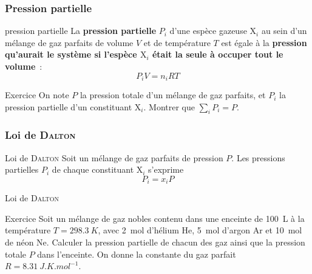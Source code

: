 \documentclass[../main/main.tex]{subfiles}
\begin{document}
\subsubsection{Pression partielle}
\begin{tcbraster}[raster columns=2, raster equal height=rows]
    \begin{defi}[label=def:ppartielle]{pression partielle}
        La \textbf{pression partielle} $P_i$ d'une espèce gazeuse $\mathrm{X}_i$ au sein d'un
        mélange de gaz parfaits de volume $V$ et de température $T$ est égale à
        la \textbf{pression qu'aurait le système si l'espèce $\mathrm{X}_i$ était la
        seule à occuper tout le volume}~:
        \[\boxed{P_iV = n_i RT}\]
    \end{defi}
    \begin{NCexem}[width=\linewidth]{Exercice}
        On note $P$ la pression totale d'un mélange de gaz parfaits, et $P_i$ la
        pression partielle d'un constituant $\mathrm{X}_i$. Montrer que $\sum_i P_i = P$.
        \tcblower
    \end{NCexem}
\end{tcbraster}

\subsubsection{Loi de \textsc{Dalton}}
\begin{tcbraster}[raster columns=2, raster equal height=rows]
    \begin{loi}[label=loi:dalton]{Loi de \textsc{Dalton}}
        Soit un mélange de gaz parfaits de pression $P$. Les pressions
        partielles $P_i$ de chaque constituant $\mathrm{X}_i$ s'exprime
        \[\boxed{P_i = x_iP}\]
    \end{loi}
    \begin{demo}[label=demo:dalton]{Loi de \textsc{Dalton}}
        
    \end{demo}
\end{tcbraster}

\begin{NCexem}[width=\linewidth]{Exercice}
    Soit un mélange de gaz nobles contenu dans une enceinte de \SI{100}{L} à la
    température $T = \SI{298.3}{K}$, avec \SI{2}{mol} d'hélium He, \SI{5}{mol}
    d'argon Ar et \SI{10}{mol} de néon Ne. Calculer la pression partielle de chacun
    des gaz ainsi que la pression totale $P$ dans l'enceinte. On donne la
    constante du gaz parfait $R = \SI{8.31}{J.K.mol^{-1}}$.
    \tcblower
    \vspace{3cm}
\end{NCexem}
\end{document}
